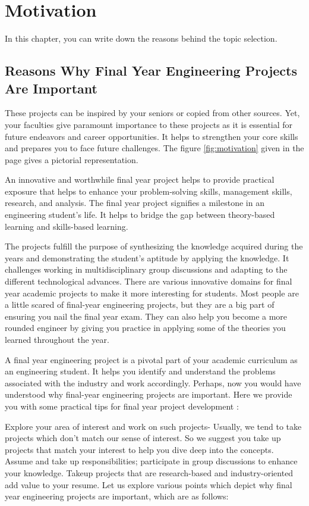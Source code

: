 \chapter{Motivation}

In this chapter, you can write down the reasons behind the topic selection. 

\section{Reasons Why Final Year Engineering Projects Are Important} 


These projects can be inspired by your seniors or copied from other sources. Yet, your faculties give paramount importance to these projects as it is essential for future endeavors and career opportunities. It helps to strengthen your core skills and prepares you to face future challenges. The figure \ref{fig:motivation} given in the page \pageref{fig:motivation} gives a pictorial representation.

An innovative and worthwhile final year project helps to provide practical exposure that helps to enhance your problem-solving skills, management skills, research, and analysis. The final year project signifies a milestone in an engineering student’s life. It helps to bridge the gap between theory-based learning and skills-based learning.

The projects fulfill the purpose of synthesizing the knowledge acquired during the years and demonstrating the student’s aptitude by applying the knowledge. It challenges working in multidisciplinary group discussions and adapting to the different technological advances. There are various innovative domains for final year academic projects to make it more interesting for students.
Most people are a little scared of final-year engineering projects, but they are a big part of ensuring you nail the final year exam. They can also help you become a more rounded engineer by giving you practice in applying some of the theories you learned throughout the year.

A final year engineering project is a pivotal part of your academic curriculum as an engineering student. It helps you identify and understand the problems associated with the industry and work accordingly. Perhaps, now you would have understood why final-year engineering projects are important.
Here we provide you with some practical tips for final year project development :

Explore your area of interest and work on such projects- Usually, we tend to take projects which don’t match our sense of interest. So we suggest you take up projects that match your interest to help you dive deep into the concepts.
Assume and take up responsibilities; participate in group discussions to enhance your knowledge.
Takeup projects that are research-based and industry-oriented add value to your resume.
Let us explore various points which depict why final year engineering projects are important, which are as follows:

